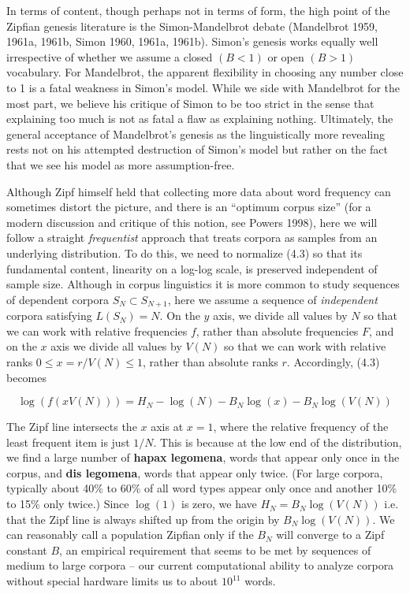 In terms of content, though perhaps not in terms of form, the high point of
the Zipfian genesis literature is the Simon-Mandelbrot debate (Mandelbrot
1959, 1961a, 1961b, Simon 1960, 1961a, 1961b).  Simon's genesis works equally
well irrespective of whether we assume a closed $(B < 1)$ or open $(B > 1)$
vocabulary.  For Mandelbrot, the apparent flexibility in choosing any number
close to 1 is a fatal weakness in Simon's model. While we side with Mandelbrot
for the most part, we believe his critique of Simon to be too strict in the
sense that explaining too much is not as fatal a flaw as explaining
nothing. Ultimately, the general acceptance of Mandelbrot's genesis as the
linguistically more revealing rests not on his attempted destruction of
Simon's model but rather on the fact that we see his model as more
assumption-free. \nocite{Mandelbrot:1959} \nocite{Mandelbrot:1961}
\nocite{Mandelbrot:1961a} \nocite{Mandelbrot:1961b} \nocite{Simon:1960}
\nocite{Simon:1961}\nocite{Simon:1961a}

Although Zipf himself held that collecting more data about word frequency can
sometimes distort the picture, and there is an ``optimum corpus size'' (for a
modern discussion and critique of this notion, see Powers \nocite{Powers:1998}
1998), here we will follow a straight {\it frequentist} approach that treats
corpora as samples from an underlying distribution. To do this, we need to
normalize (4.3) so that its fundamental content, linearity on a log-log scale,
is preserved independent of sample size. Although in corpus linguistics it is
more common to study sequences of dependent corpora $S_N \subset S_{N+1}$,
here we assume a sequence of {\it independent} corpora satisfying $L(S_N)=N$.
On the $y$ axis, we divide all values by $N$ so that we can work with relative
frequencies $f$, rather than absolute frequencies $F$, and on the $x$ axis
we divide all values by $V(N)$ so that we can work with relative ranks $0 \leq
x = r/V(N) \leq 1$, rather than absolute ranks $r$. Accordingly, (4.3) becomes


\vspace*{-3mm}
\begin{equation} %
\log(f(xV(N))) = H_N - \log(N) -B_N\log(x) - B_N\log(V(N))
\end{equation}

\noindent
The Zipf line intersects the $x$ axis at $x=1$, where the relative frequency
of the least frequent item is just $1/N$. This is because at the low end of
the distribution, we find a large number of {\bf hapax legomena}, words that
appear only once in the corpus, and {\bf dis legomena}, words that appear only
twice. (For large corpora, typically about 40\% to 60\% of all word types
appear only once and another 10\% to 15\% only twice.) Since $\log(1)$ is
zero, we have $H_N=B_N\log(V(N))$ i.e. that the Zipf line is always shifted up
from the origin by $B_N\log(V(N))$. We can reasonably call a population Zipfian
only if the $B_N$ will converge to a Zipf constant $B$, an empirical
requirement that seems to be met by sequences of medium to large corpora --
our current computational ability to analyze corpora without special hardware
limits us to about $10^{11}$ words.

